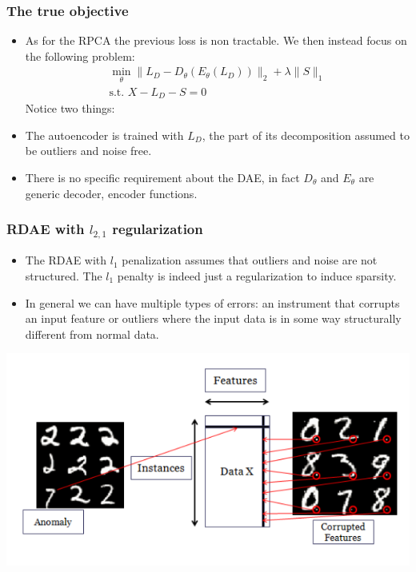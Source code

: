 \documentclass{beamer}
\theoremstyle{plain}
\theoremstyle{definition}
\theoremstyle{remark}
\newcommand{\norm}[1]{\lVert#1\rVert}
\begin{document}
	
\begin{frame}
	\frametitle{The true objective}
	\begin{itemize}
		\item As for the RPCA the previous loss is non tractable. We then instead focus on the following problem:
			\begin{align}
				\min_{\theta}{\norm{L_D -D_{\theta}(E_{\theta}(L_D))}_2 + \lambda\norm{S}_1}\\
				\text{s.t. }X-L_D-S=0  
			\end{align}
			Notice two things:
		\item The autoencoder is trained with $L_D$, the part of its decomposition assumed to be outliers and noise free.
		\item There is no specific requirement about the DAE, in fact $D_{\theta}$ and $E_{\theta}$ are generic decoder, encoder functions.
	\end{itemize}
\end{frame}

\begin{frame}
	\frametitle{RDAE with $l_{2,1}$ regularization}
	\begin{itemize}
		\item The RDAE with $l_1$ penalization assumes that outliers and noise are not structured. The $l_1$ penalty is indeed just a regularization to induce sparsity.
		\item In general we can have multiple types of errors: an instrument that corrupts an input feature or outliers where the input data is in some way structurally different from normal data.
	\end{itemize}
\end{frame}

\begin{frame}
	\centering
	\includegraphics[width=0.9\linewidth]{Images/diff_anomalies.png}
\end{frame}
\end{document}
